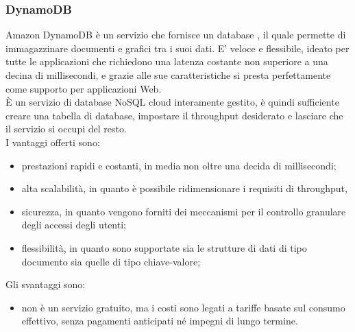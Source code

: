 \subsubsection{DynamoDB}
Amazon DynamoDB è un servizio che fornisce un database , il quale permette di immagazzinare documenti e grafici tra i suoi dati. E' veloce e flessibile, ideato per tutte le applicazioni che richiedono una latenza costante non superiore a una decina di millisecondi, e grazie alle sue caratteristiche si presta perfettamente come supporto per applicazioni Web.\\
È un servizio di database NoSQL cloud interamente gestito, è quindi sufficiente creare una tabella di database, impostare il throughput desiderato e lasciare che il servizio si occupi del resto. \\
I vantaggi offerti sono:
\begin{itemize}
	\item prestazioni rapidi e costanti, in media non oltre una decida di millisecondi;
	\item alta scalabilità, in quanto è possibile ridimensionare i requisiti di throughput,
	\item sicurezza, in quanto vengono forniti dei meccanismi per il controllo granulare degli accessi degli utenti;
	\item flessibilità, in quanto sono supportate sia le strutture di dati di tipo documento sia quelle di tipo chiave-valore;
\end{itemize}
Gli svantaggi sono:
\begin{itemize}
	\item non è un servizio gratuito, ma i costi sono legati a tariffe basate sul consumo effettivo, senza pagamenti anticipati né impegni di lungo termine.
\end{itemize}
